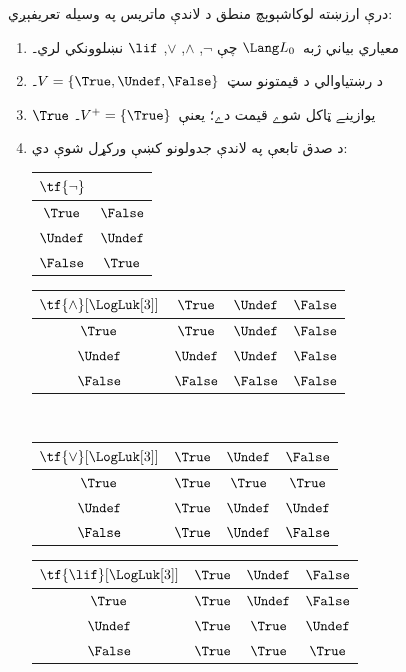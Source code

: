 \documentclass[../../../include/open-logic-section]{subfiles}
\begin{document}
\begin{defn}
درې ارزښته لوکاشېوېچ منطق د لاندې ماتريس په وسيله تعريفېږي:
\begin{enumerate}
  \item معياري بياني ژبه~$\Lang L_0$ چې
  $\lnot$, $\land$, $\lor$, $\lif$
  نښلوونکي لري۔
  \item د رښتياوالي د قيمتونو سټ~$V = \{\True, \Undef, \False\}$۔
  \item $\True$ يوازينے ټاکل شوے قيمت دے؛ يعنې~$V^+ = \{\True\}$۔
  \item د صدق تابعې په لاندې جدولونو کښې ورکړل شوې دي:
  \begin{center}
    \begin{tabular}{c|c} 
      $\tf{\lnot}$ & \\ 
      \hline  
      $\True$ & $\False$ \\ 
      $\Undef$ & $\Undef$ \\
      $\False$ & $\True$ 
    \end{tabular}
    \quad
    \begin{tabular}{c|ccc} 
      $\tf{\land}[\LogLuk[3]]$ & $\True$ & $\Undef$ & $\False$ \\ 
      \hline 
      $\True$ & $\True$ & $\Undef$ & $\False$ \\ 
      $\Undef$ & $\Undef$ & $\Undef$ & $\False$\\ 
      $\False$ & $\False$ & $\False$ & $\False$ 
    \end{tabular}
    \\[2ex]
    \begin{tabular}{c|ccc} 
      $\tf{\lor}[\LogLuk[3]]$ & $\True$ & $\Undef$ & $\False$ \\ 
      \hline 
      $\True$ & $\True$ & $\True$ & $\True$ \\ 
      $\Undef$ & $\True$ & $\Undef$ & $\Undef$ \\
      $\False$ & $\True$ & $\Undef$ & $\False$ 
    \end{tabular}
    \quad
    \begin{tabular}{c|ccc} 
      $\tf{\lif}[\LogLuk[3]]$ & $\True$ & $\Undef$ & $\False$ \\ 
      \hline 
      $\True$ & $\True$ & $\Undef$ & $\False$ \\ 
      $\Undef$ & $\True$ & $\True$ & $\Undef$  \\ 
      $\False$ & $\True$ & $\True$ & $\True$ 
    \end{tabular}
  \end{center} 
\end{enumerate}
\end{defn}
\end{document}
